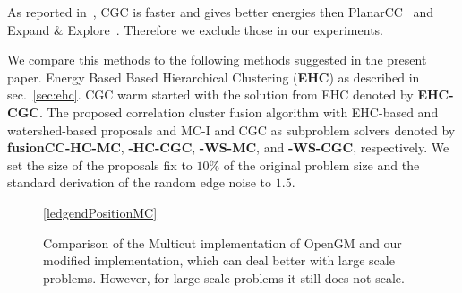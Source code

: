 \documentclass[10pt,twocolumn,letterpaper]{article}
\begin{document}
As reported in~\cite{beier_2014_cvpr}, CGC is faster and gives better energies then PlanarCC~\cite{yarkony_2012_eccv} and Expand \& Explore~\cite{bagon_2011_arxiv}.
Therefore we exclude those in our experiments.

We compare this methods to the following methods suggested in the present paper.
%
Energy Based Based Hierarchical Clustering (\textbf{EHC})
as described in sec.~\ref{sec:ehc}.
%
CGC warm started with the solution from EHC denoted by \textbf{EHC-CGC}.
%
The proposed correlation cluster fusion algorithm with EHC-based and watershed-based proposals
 and MC-I and CGC as subproblem solvers denoted by 
\textbf{fusionCC-HC-MC},
\textbf{-HC-CGC},
\textbf{-WS-MC}, and 
\textbf{-WS-CGC}, respectively.
We set the size of the proposals fix to $10\%$ of the original problem size
and the standard derivation of the random edge noise to $1.5$.


 \begin{figure}[t]
    \centering
  \begin{center}
  \hypersetup{linkcolor = black}
  \ref{ledgendPositionMC}
  \hypersetup{linkcolor = red}
  \end{center}
    \caption{Comparison of the Multicut implementation of OpenGM and 
    our modified implementation, which can deal better with large scale problems. 
    However, for large scale problems it still does not scale.}
    \label{fig:at:knott-450b}
  \end{figure}
\end{document}
